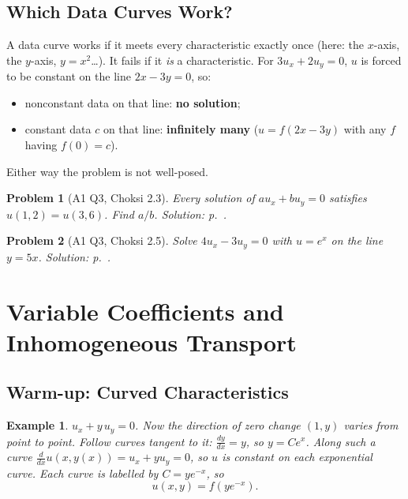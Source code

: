 \documentclass{article}
\newtheorem{problem}{Problem}
\newtheorem*{example}{Example}
\begin{document}
\subsection{Which Data Curves Work?}
A data curve works if it meets every characteristic exactly once (here: the $x$-axis, the $y$-axis, $y = x^2$\dots). It fails if it \emph{is} a characteristic. For $3u_x + 2u_y = 0$, $u$ is forced to be constant on the line $2x - 3y = 0$, so:
\begin{itemize}
    \item nonconstant data on that line: \textbf{no solution};
    \item constant data $c$ on that line: \textbf{infinitely many} ($u = f(2x-3y)$ with any $f$ having $f(0) = c$).
\end{itemize}
Either way the problem is not well-posed.

\begin{problem}[A1 Q3, Choksi 2.3]\label{prob:a1-23}
    Every solution of $au_x + bu_y = 0$ satisfies $u(1,2) = u(3,6)$. Find $a/b$.
    \hfill \emph{Solution: p.~\pageref{sol:a1-23}.}
\end{problem}
\begin{problem}[A1 Q3, Choksi 2.5]\label{prob:a1-25}
    Solve $4u_x - 3u_y = 0$ with $u = e^x$ on the line $y = 5x$.
    \hfill \emph{Solution: p.~\pageref{sol:a1-25}.}
\end{problem}


\section{Variable Coefficients and Inhomogeneous Transport}

\subsection{Warm-up: Curved Characteristics}
\begin{example}
    $u_x + y\,u_y = 0$. Now the direction of zero change $(1,y)$ varies from point to point. Follow curves tangent to it: $\frac{dy}{dx} = y$, so $y = Ce^x$. Along such a curve $\frac{d}{dx}u(x, y(x)) = u_x + y u_y = 0$, so $u$ is constant on each exponential curve. Each curve is labelled by $C = y e^{-x}$, so
    \begin{equation}
        u(x,y) = f(y e^{-x}).
    \end{equation}
\end{example}
\end{document}
